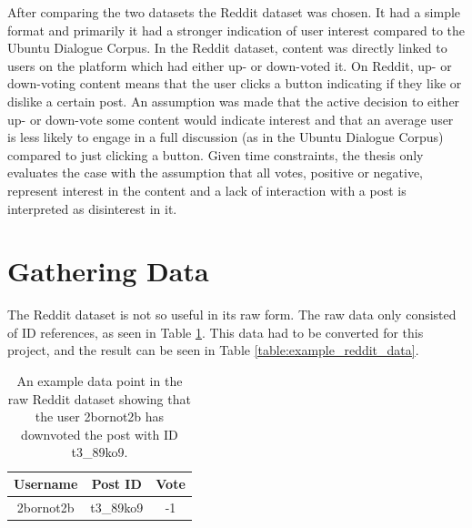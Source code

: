 After comparing the two datasets the Reddit dataset was chosen. It had a simple format and primarily it had a stronger indication of user interest compared to the Ubuntu Dialogue Corpus. In the Reddit dataset, content was directly linked to users on the platform which had either up- or down-voted it. On Reddit, up- or down-voting content means that the user clicks a button indicating if they like or dislike a certain post. An assumption was made that the active decision to either up- or down-vote some content would indicate interest and that an average user is less likely to engage in a full discussion (as in the Ubuntu Dialogue Corpus) compared to just clicking a button. Given time constraints, the thesis only evaluates the case with the assumption that all votes, positive or negative, represent interest in the content and a lack of interaction with a post is interpreted as disinterest in it.
\section{Gathering Data}\label{sec:gathering_data}
The Reddit dataset is not so useful in its raw form. The raw data only consisted of ID references, as seen in Table \ref{table:raw_reddit_data}. This data had to be converted for this project, and the result can be seen in Table \ref{table:example_reddit_data}.
\begin{table}[h!]
    \centering
    \begin{tabular}{ c c c } 
        \hline
        \textbf{Username} & \textbf{Post ID} & \textbf{Vote} \\
        \hline
        \hline
        2bornot2b & t3\_89ko9 &-1\\
        \hline
    \end{tabular}
    \caption{An example data point in the raw Reddit dataset showing that the user 2bornot2b has downvoted the post with ID t3\_89ko9.}
    \label{table:raw_reddit_data}
\end{table}

